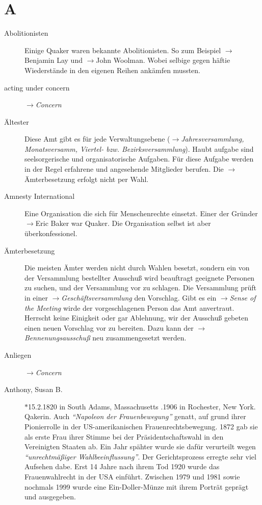 \section*{A}

\articlesize
\begin{description}

 \item[Abolitionisten] Einige Quaker waren bekannte Abolitionisten. So zum Beispiel $\to$Benjamin Lay und $\to$John Woolman. Wobei selbige gegen häftie Wiederstände in den eigenen Reihen ankämfen mussten.

 \item[acting under concern] $\to$\textit{Concern}

 \item[Ältester] Diese Amt gibt es für jede Verwaltungsebene ($\to$\textit{Jahresversammlung, Monatsversamm, Viertel- bzw. Bezirksversammlung}). Haubt aufgabe sind seelsorgerische und organisatorische Aufgaben. Für diese Aufgabe werden in der Regel erfahrene und angesehende Mitglieder berufen. Die $\to$Ämterbesetzung erfolgt nicht per Wahl.

 \item[Amnesty International] Eine Organisation die sich für Menschenrechte einsetzt. Einer der Gründer $\to$Eric Baker war Quaker. Die Organisation selbst ist aber überkonfessionel.

 \item[Ämterbesetzung]  Die meisten Ämter werden nicht durch Wahlen besetzt, sondern ein von der Versammlung bestellter Ausschuß wird beauftragt geeignete Personen zu suchen, und der Versammlung vor zu schlagen. Die Versammlung prüft in einer $\to$\textit{Geschäftsversammlung} den Vorschlag. Gibt es ein $\to$\textit{Sense of the Meeting} wirde der vorgeschlagenen Person das Amt anvertraut. Herrscht keine Einigkeit oder gar Ablehnung, wir der Ausschuß gebeten einen neuen Vorschlag vor zu bereiten. Dazu kann der $\to$\textit{Bennenungsausschuß} neu zusammengesetzt werden.

 \item[Anliegen] $\to$\textit{Concern}

 \item[Anthony, Susan B.] $\ast$15.2.1820 in South Adams, Massachusetts .1906 in Rochester, New York. Qakerin. Auch \textit{"`Napoleon der Frauenbewegung"'} genatt, auf grund ihrer Pionierrolle in der US-amerikanischen Frauenrechtsbewegung. 1872 gab sie als erste Frau ihrer Stimme bei der Präsidentschaftswahl in den Vereinigten Staaten ab. Ein Jahr spähter wurde sie dafür verurteilt wegen \textit{"`unrechtmäßiger Wahlbeeinflussung"'}. Der Gerichtsprozess erregte sehr viel Aufsehen dabe. Erst 14 Jahre nach ihrem Tod 1920 wurde das Frauenwahlrecht in der USA einführt. Zwischen 1979 und 1981 sowie nochmals 1999 wurde eine Ein-Doller-Münze mit ihrem Porträt geprägt und ausgegeben.


\end{description}
